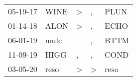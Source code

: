 \begin{supertabular}{p{0.07\textwidth}p{0.06\textwidth}p{0.02\textwidth}p{0.02\textwidth}p{0.06\textwidth}}
 05-19-17\textsuperscript{} &           WINE\textsuperscript{} &     \textgreater &             , &           PLUN\textsuperscript{} \\
 01-14-18\textsuperscript{} &           ALON\textsuperscript{} &     \textgreater &             , &           ECHO\textsuperscript{} \\
 06-01-19\textsuperscript{} &           mulc\textsuperscript{} &                  &             , &           BTTM\textsuperscript{} \\
 11-09-19\textsuperscript{} &           HIGG\textsuperscript{} &                , &             , &           COND\textsuperscript{} \\
 03-05-20\textsuperscript{} &           reso\textsuperscript{} &     \textgreater &  \textgreater &           reso\textsuperscript{} \\
\end{supertabular}
